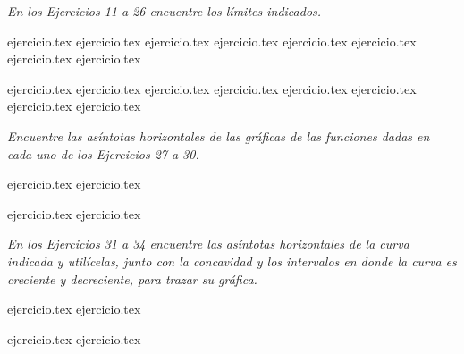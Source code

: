 \vspace{1em}
\noindent \textit{En los Ejercicios 11 a 26 encuentre los límites indicados.}

\begin{enumerate}
    \setcounter{enumi}{10}
    \begin{minipage}{0.45\textwidth}
    {ejercicio.tex}
    {ejercicio.tex}
    {ejercicio.tex}
    {ejercicio.tex}
    {ejercicio.tex}
    {ejercicio.tex}
    {ejercicio.tex}
    {ejercicio.tex}
    \end{minipage}%
    \begin{minipage}{0.45\textwidth}
    {ejercicio.tex}
    {ejercicio.tex}
    {ejercicio.tex}
    {ejercicio.tex}
    {ejercicio.tex}
    {ejercicio.tex}
    {ejercicio.tex}
    {ejercicio.tex}
    \end{minipage}
\end{enumerate}

\vspace{1em}
\noindent \textit{Encuentre las asíntotas horizontales de las gráficas de las funciones dadas en cada uno de los Ejercicios 27 a 30.}

\begin{enumerate}
    \setcounter{enumi}{26}
    \begin{minipage}{0.45\textwidth}
    {ejercicio.tex}
    {ejercicio.tex}
    \end{minipage}%
    \begin{minipage}{0.45\textwidth}
    {ejercicio.tex}
    {ejercicio.tex}
    \end{minipage}
\end{enumerate}

\vspace{1em}
\noindent \textit{En los Ejercicios 31 a 34 encuentre las asíntotas horizontales de la curva indicada y utilícelas, junto con la concavidad y los intervalos en donde la curva es creciente y decreciente, para trazar su gráfica.}

\begin{enumerate}
    \setcounter{enumi}{30}
    \begin{minipage}{0.45\textwidth}
    {ejercicio.tex}
    {ejercicio.tex}
    \end{minipage}%
    \begin{minipage}{0.45\textwidth}
    {ejercicio.tex}
    {ejercicio.tex}
    \end{minipage}
\end{enumerate}

